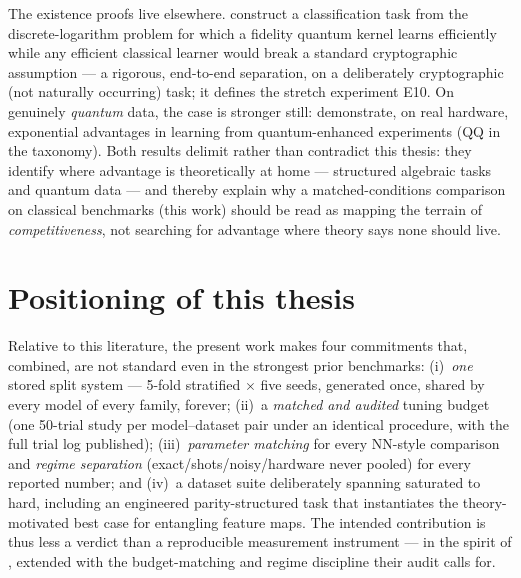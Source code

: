 The existence proofs live elsewhere. \citet{liu2021rigorous} construct a
classification task from the discrete-logarithm problem for which a fidelity
quantum kernel learns efficiently while any efficient classical learner would
break a standard cryptographic assumption --- a rigorous, end-to-end
separation, on a deliberately cryptographic (not naturally occurring) task;
it defines the stretch experiment E10. On genuinely \emph{quantum} data, the
case is stronger still: \citet{huang2022advantage} demonstrate, on real
hardware, exponential advantages in learning from quantum-enhanced
experiments (QQ in the taxonomy). Both results delimit rather than contradict
this thesis: they identify where advantage is theoretically at home ---
structured algebraic tasks and quantum data --- and thereby explain why a
matched-conditions comparison on classical benchmarks (this work) should be
read as mapping the terrain of \emph{competitiveness}, not searching for
advantage where theory says none should live.

\section{Positioning of this thesis}
\label{sec:related-positioning}

Relative to this literature, the present work makes four commitments that,
combined, are not standard even in the strongest prior benchmarks:
(i)~\emph{one} stored split system --- 5-fold stratified $\times$ five seeds,
generated once, shared by every model of every family, forever; (ii)~a
\emph{matched and audited} tuning budget (one 50-trial study per
model--dataset pair under an identical procedure, with the full trial log
published); (iii)~\emph{parameter matching} for every NN-style comparison and
\emph{regime separation} (exact/shots/noisy/hardware never pooled) for every
reported number; and (iv)~a dataset suite deliberately spanning saturated to
hard, including an engineered parity-structured task that instantiates the
theory-motivated best case for entangling feature maps. The intended
contribution is thus less a verdict than a reproducible measurement
instrument --- in the spirit of \citet{bowles2024better}, extended with the
budget-matching and regime discipline their audit calls for.
